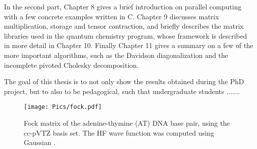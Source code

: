 In the second part, Chapter 8 gives a brief introduction on parallel computing with a few concrete examples written in C. Chapter 9 discusses matrix multiplication, storage and tensor contraction, and briefly describes the matrix libraries used in the \mchem{} quantum chemistry program, whose framework is described in more detail in Chapter 10. Finally Chapter 11 gives a summary on a few of the more important algorithms, such as the Davidson diagonalization and the incomplete pivoted Cholesky decomposition.    

The goal of this thesis is to not only show the results obtained during the PhD project, but to also to be pedagogical, such that undergraduate students .......

\begin{figure}
\centering
\texttt{[image: Pics/fock.pdf]}
\caption{Fock matrix of the adenine-thymine (AT) DNA base pair, using the cc-pVTZ basis set. The HF wave function was computed using Gaussian \cite{}.}
\label{SparseExample}
\end{figure}